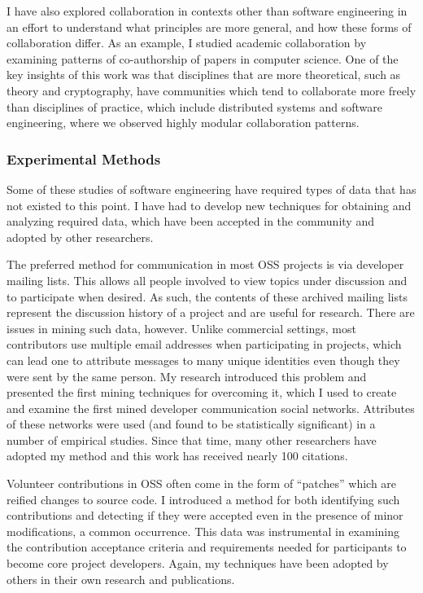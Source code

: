 \documentclass[10pt]{article}
\newcommand\Subsection[1]{\subsubsection*{\small #1}}
\begin{document}
\begin{small}
I have also explored collaboration in contexts other than software engineering
in an effort to understand what principles are more general, and how these forms of
collaboration differ.  As an example, I studied academic collaboration by
examining patterns of co-authorship of papers in computer science.  One of the
key insights of this work was that disciplines that are more theoretical, such
as theory and cryptography, have communities which tend to collaborate more
freely than disciplines of practice, which include distributed systems and
software engineering, where we observed highly modular collaboration patterns.

\Subsection{Experimental Methods}

Some of these studies of software engineering have required types of data that
has not existed to this point. I have had to develop new techniques for
obtaining and analyzing required data, which have been accepted in the
community and adopted by other researchers.

The preferred method for communication in most OSS projects is via developer
mailing lists.  This allows all people involved to view topics under discussion
and to participate when desired.  As such, the contents of these archived
mailing lists represent the discussion history of a project and are useful for
research.  There are issues in mining such data, however.  Unlike commercial
settings, most contributors use multiple email addresses when participating in
projects, which can lead one to attribute messages to many unique identities
even though they were sent by the same person.  My research introduced this
problem and presented the first mining techniques for overcoming it, which I
used to create and examine the first mined developer communication social
networks.  Attributes of these networks were used (and found to be
statistically significant) in a number of empirical studies.  Since that time,
many other researchers have adopted my method and
this work has received nearly 100 citations.

Volunteer contributions in OSS often come in the form of ``patches'' which are
reified changes to source code.  I introduced a method for both identifying
such contributions and detecting if they were accepted even in the presence of
minor modifications, a common occurrence.  This data was instrumental in
examining the contribution acceptance criteria and requirements needed for
participants to become core project developers.  Again, my techniques have
been adopted by others in their own research and publications.


\end{small}
\end{document}
